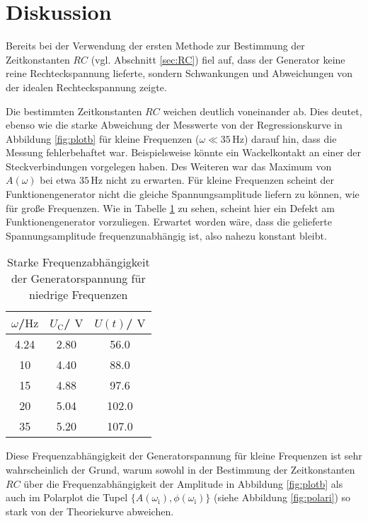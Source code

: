\section{Diskussion}
\label{sec:Diskussion}
Bereits bei der Verwendung der ersten Methode zur Bestimmung der Zeitkonstanten $RC$ (vgl. Abschnitt \ref{sec:RC}) fiel %
auf, dass der Generator keine reine Rechteckspannung lieferte, sondern Schwankungen und Abweichungen von der idealen Rechteckspannung zeigte.

Die bestimmten Zeitkonstanten $RC$ weichen deutlich voneinander ab. Dies deutet, ebenso wie die starke Abweichung der Messwerte von der Regressionskurve
in Abbildung \ref{fig:plotb} für kleine Frequenzen ($\omega \ll 35\,\si{\Hz}$) darauf hin, dass die Messung fehlerbehaftet war. Beispielsweise könnte ein Wackelkontakt an einer der Steckverbindungen vorgelegen haben.
Des Weiteren war das Maximum von $A(\omega)$ bei etwa $35 \,\si{\Hz}$ nicht zu erwarten. Für kleine Frequenzen scheint der Funktionengenerator nicht die gleiche Spannungsamplitude liefern zu können, wie für große Frequenzen.
Wie in Tabelle \ref{tab:diskussion} zu sehen, scheint hier ein Defekt am Funktionengenerator vorzuliegen. Erwartet worden wäre, dass die gelieferte Spannungsamplitude frequenzunabhängig ist, also nahezu konstant bleibt.

\begin{table}
	\centering
	\caption{Starke Frequenzabhängigkeit der Generatorspannung für niedrige Frequenzen}
	\label{tab:diskussion}
	\begin{tabular}{ccc}
		\toprule
		$\omega$/$\si{\Hz}$ & $U_\text{C}$/ $\si{\volt}$ & $U(t)$/ $\si{\volt}$ \\
		\midrule
		4.24                & 2.80                       & 56.0                 \\
		10                  & 4.40                       & 88.0                 \\
		15                  & 4.88                       & 97.6                 \\
		20                  & 5.04                       & 102.0                \\
		35                  & 5.20                       & 107.0                \\
		\bottomrule
	\end{tabular}
\end{table}
Diese Frequenzabhängigkeit der Generatorspannung für kleine Frequenzen ist sehr wahrscheinlich der Grund, warum sowohl in der Bestimmung der Zeitkonstanten $RC$ über die Frequenzabhängigkeit der Amplitude in
Abbildung \ref{fig:plotb} als auch im Polarplot die Tupel $\{A(\omega_{\text{i}}), \phi(\omega_{\text{i}}) \}$ (siehe Abbildung \ref{fig:polari}) so stark von der Theoriekurve abweichen.

